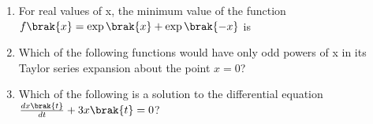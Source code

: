 \documentclass[a4paper, 11pt]{article}
\begin{document}
\begin{enumerate}
    \hfill{}

    \item For real values of x, the minimum value of the function $f\brak{x}=\exp\brak{x}+\exp\brak{-x}$ is
    
    \begin{enumerate}
    \end{enumerate}
    
    \hfill{}

    \item Which of the following functions would have only odd powers of x in its Taylor series expansion about the point $x=0$?
    
    \begin{enumerate}
    \end{enumerate}
    
    \hfill{}

    \item Which of the following is a solution to the differential equation $\frac{dx\brak{t}}{dt}+3x\brak{t}=0$?
    
    \begin{enumerate}
    \end{enumerate}
    

\end{enumerate}
\end{document}
